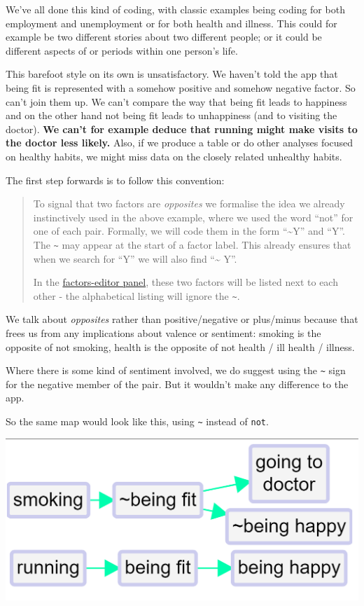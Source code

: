 \documentclass[
]{book}
\begin{document}
We've all done this kind of coding, with classic examples being coding for both employment and unemployment or for both health and illness. This could for example be two different stories about two different people; or it could be different aspects of or periods within one person's life.

This barefoot style on its own is unsatisfactory. We haven't told the app that being fit is represented with a somehow positive and somehow negative factor. So can't join them up. We can't compare the way that being fit leads to happiness and on the other hand not being fit leads to unhappiness (and to visiting the doctor). \textbf{We can't for example deduce that running might make visits to the doctor less likely.} Also, if we produce a table or do other analyses focused on healthy habits, we might miss data on the closely related unhealthy habits.

The first step forwards is to follow this convention:

\begin{quote}
To signal that two factors are \emph{opposites} we formalise the idea we already instinctively used in the above example, where we used the word ``not'' for one of each pair. Formally, we will code them in the form ``\textasciitilde Y'' and ``Y''. The \texttt{\textasciitilde{}} may appear at the start of a factor label. This already ensures that when we search for ``Y'' we will also find ``\textasciitilde{} Y''.

In the \protect\hyperlink{xfactor-editor}{factors-editor panel}, these two factors will be listed next to each other - the alphabetical listing will ignore the \texttt{\textasciitilde{}}.
\end{quote}

We talk about \emph{opposites} rather than positive/negative or plus/minus because that frees us from any implications about valence or sentiment: smoking is the opposite of not smoking, health is the opposite of not health / ill health / illness.

Where there is some kind of sentiment involved, we do suggest using the \texttt{\textasciitilde{}} sign for the negative member of the pair. But it wouldn't make any difference to the app.

So the same map would look like this, using \texttt{\textasciitilde{}} instead of \texttt{not}.

\includegraphics[width=6.77083in,height=\textheight]{_assets/121007.png}
\end{document}
